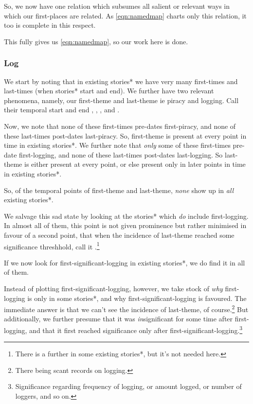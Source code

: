 			So, we now have one relation which subsumes all salient or relevant ways in which our first-places are related. As \ref{eqn:namedmap} charts only this relation, it too is complete in this respect.
			
			This fully gives us \ref{eqn:namedmap}, so our work here is done.
		\subsubsection{Log}
		\label{sss:log}
			We start by noting that in existing stories* we have very many first-times and last-times (when stories* start and end). We further have two relevant phenomena, namely, our first-theme and last-theme ie piracy and logging. Call their temporal start and end , , , and .
			
			Now, we note that none of these first-times pre-dates first-piracy, and none of these last-times post-dates last-piracy. So, first-theme is present at every point in time in existing stories*. We further note that \emph{only} some of these first-times pre-date first-logging, and none of these last-times post-dates last-logging. So last-theme is either present at every point, or else present only in later points in time in existing stories*.
			
			So, of the temporal points of first-theme and last-theme, \emph{none} show up in \emph{all} existing stories*.
			
			We salvage this sad state by looking at the stories* which \emph{do} include first-logging. In almost all of them, this point is not given prominence but rather minimised in favour of a second point, that when the incidence of last-theme reached some significance threshhold, call it .\footnote{There is a further  in some existing stories*, but it's not needed here.}
			
			If we now look for first-significant-logging in existing stories*, we do find it in all of them.
			
			Instead of plotting first-significant-logging, however, we take stock of \emph{why} first-logging is only in some stories*, and why first-significant-logging is favoured. The immediate answer is that we can't see the incidence of last-theme, of course.\footnote{There being scant records on logging.} But additionally, we further presume that it was \emph{in}significant for some time after first-logging, and that it first reached significance only after first-significant-logging.\footnote{Significance regarding frequency of logging, or amount logged, or number of loggers, and so on.}
			
